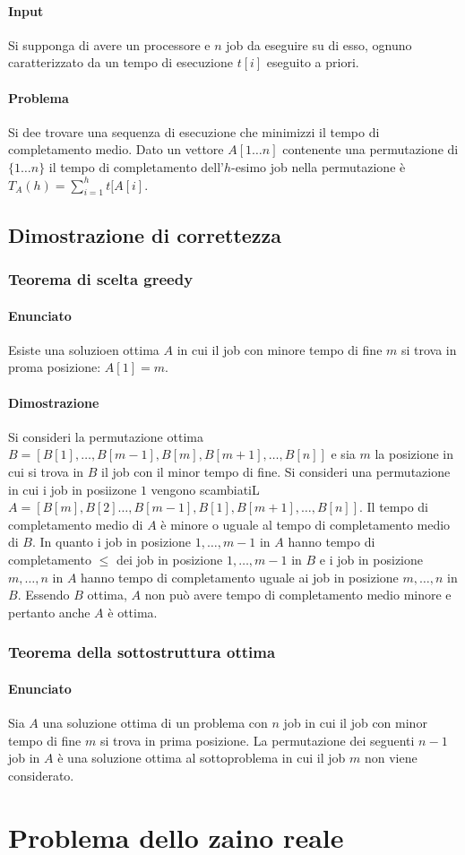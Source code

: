 \paragraph{Input}
Si supponga di avere un processore e $n$ job da eseguire su di esso, ognuno caratterizzato da un tempo di esecuzione $t[i]$ eseguito a priori.
\paragraph{Problema}
Si dee trovare una sequenza di esecuzione che minimizzi il tempo di completamento medio. Dato un vettore $A[1\dots n]$ contenente una permutazione di $\{1\dots n\}$ il tempo di 
completamento dell'$h$-esimo job nella permutazione \`e $T_A(h) = \sum\limits_{i = 1}^h t[A[i]$. 
\subsection{Dimostrazione di correttezza}
\subsubsection{Teorema di scelta greedy}
\paragraph{Enunciato}
Esiste una soluzioen ottima $A$ in cui il job con minore tempo di fine $m$ si trova in proma posizione: $A[1] = m$.
\paragraph{Dimostrazione}
Si consideri la permutazione ottima $B = [B[1], \dots, B[m-1], B[m], B[m+1], \dots, B[n]]$ e sia $m$ la posizione in cui si trova in $B$ il job con il minor tempo di fine. Si consideri
una permutazione in cui i job in posiizone $1$ vengono scambiatiL $A =[B[m], B[2] \dots, B[m-1], B[1], B[m+1], \dots, B[n]]$. Il tempo di completamento medio di $A$ \`e minore o uguale
al tempo di completamento medio di $B$. In quanto i job in posizione $1, \dots, m-1$ in $A$ hanno tempo di completamento $\le$ dei job in posizione $1, \dots, m-1$ in $B$ e i job in
posizione $m, \dots, n$ in $A$ hanno tempo di completamento uguale ai job in posizione $m, \dots, n$ in $B$. Essendo $B$ ottima, $A$ non pu\`o avere tempo di completamento medio minore
e pertanto anche $A$ \`e ottima. 
\subsubsection{Teorema della sottostruttura ottima}
\paragraph{Enunciato}
Sia $A$ una soluzione ottima di un problema con $n$ job in cui il job con minor tempo di fine $m$ si trova in prima posizione. La permutazione dei seguenti $n-1$ job in $A$ \`e una
soluzione ottima al sottoproblema in cui il job $m$ non viene considerato. 
\section{Problema dello zaino reale}
